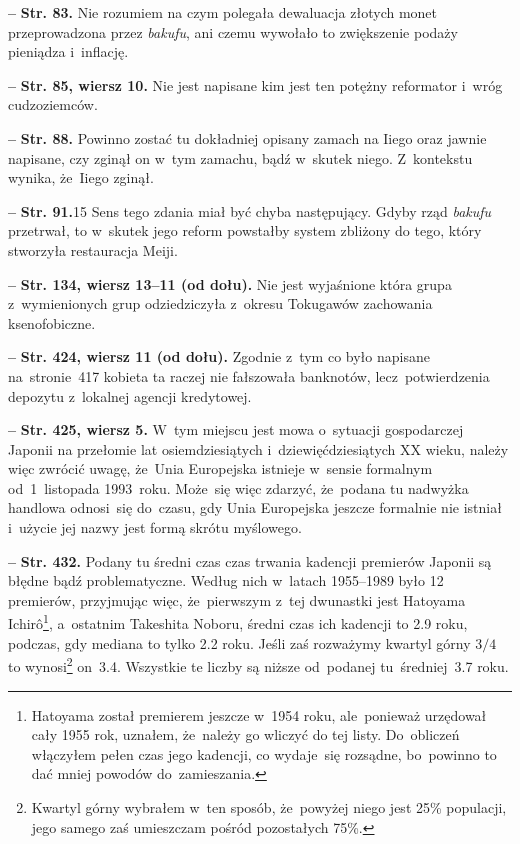 \documentclass[a4paper,11pt]{article}  %
\newcommand{\spaceFour}{0.5em}
\newcommand{\tb}{\textbf}
\newcommand{\noi}{\noindent}
\newcommand{\start}{\noi \tb{--} {}}
\newcommand{\Str}[1]{\tb{Str. #1.}}
\newcommand{\StrWg}[2]{\tb{Str. #1, wiersz #2.}}
\newcommand{\StrWd}[2]{\tb{Str. #1, wiersz #2 (od dołu).}}
\begin{document}
\start \Str{83} Nie rozumiem na czym polegała dewaluacja złotych monet
przeprowadzona przez \emph{bakufu}, ani czemu wywołało to zwiększenie
podaży pieniądza i~inflację.

\vspace{\spaceFour}


\start \StrWg{85}{10} Nie jest napisane kim jest ten potężny
reformator i~wróg cudzoziemców.

\vspace{\spaceFour}


\start \Str{88} Powinno zostać tu dokładniej opisany zamach na Iiego
oraz jawnie napisane, czy zginął on w~tym zamachu, bądź w~skutek
niego. Z~kontekstu wynika, że~Iiego zginął.

\vspace{\spaceFour}


\start \Str{91}{15} Sens tego zdania miał być chyba następujący. Gdyby
rząd \emph{bakufu} przetrwał, to w~skutek jego reform powstałby system
zbliżony do tego, który stworzyła restauracja Meiji.

\vspace{\spaceFour}


\start \StrWd{134}{13--11} Nie jest wyjaśnione która grupa
z~wymienionych grup odziedziczyła z~okresu Tokugawów zachowania
ksenofobiczne.

\vspace{\spaceFour}


\start \StrWd{424}{11} Zgodnie z~tym co było napisane na~stronie~417
kobieta ta raczej nie fałszowała banknotów, lecz~potwierdzenia
depozytu z~lokalnej agencji kredytowej.

\vspace{\spaceFour}


\start \StrWg{425}{5} W~tym miejscu jest mowa o~sytuacji gospodarczej
Japonii na przełomie lat osiemdziesiątych i~dziewięćdziesiątych XX
wieku, należy więc zwrócić uwagę, że~Unia Europejska istnieje w~sensie
formalnym od~1~listopada 1993~roku. Może~się więc zdarzyć, że~podana
tu nadwyżka handlowa odnosi~się do~czasu, gdy Unia Europejska jeszcze
formalnie nie istniał i~użycie jej nazwy jest formą skrótu myślowego.

\vspace{\spaceFour}


\start \Str{432} Podany tu średni czas czas trwania kadencji premierów
Japonii są błędne bądź problematyczne. Według nich w~latach 1955--1989
było 12 premierów, przyjmując więc, że~pierwszym z~tej dwunastki jest
Hatoyama Ichir\^{o}\footnote{Hatoyama został premierem jeszcze w~1954
  roku, ale~ponieważ urzędował cały 1955 rok, uznałem, że~należy go
  wliczyć do tej listy. Do~obliczeń włączyłem pełen czas jego
  kadencji, co wydaje~się rozsądne, bo~powinno to dać mniej powodów
  do~zamieszania.}, a~ostatnim Takeshita Noboru, średni czas ich
kadencji to 2.9 roku, podczas, gdy mediana to tylko 2.2 roku. Jeśli
zaś rozważymy kwartyl górny $3/4$ to wynosi\footnote{Kwartyl górny
  wybrałem w~ten sposób, że~powyżej niego jest 25\% populacji, jego
  samego zaś umieszczam pośród pozostałych 75\%.} on~3.4. Wszystkie te
liczby są niższe od~podanej tu~średniej~3.7 roku.
\end{document}
